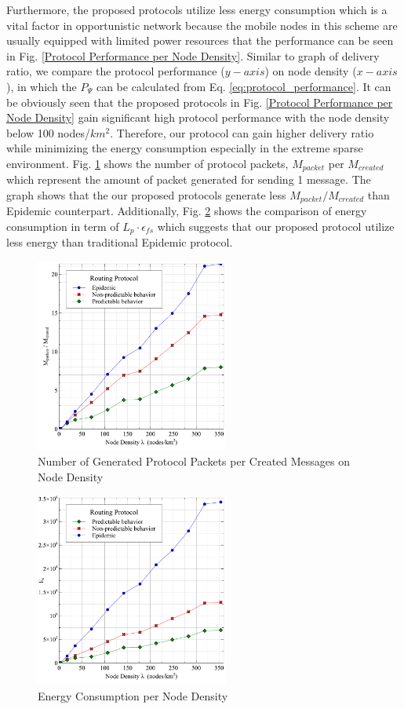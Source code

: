 \documentclass[conference]{IEEEtran}
\begin{document}
Furthermore, the proposed protocols utilize less energy consumption which is a vital factor in opportunistic network because the mobile nodes in this scheme are usually equipped with limited power resources that the performance can be seen in Fig. \ref{Protocol Performance per Node Density}.
Similar to graph of delivery ratio, we compare the protocol performance ($y-axis$) on node density ($x-axis$), in which the $P_{\Psi}$ can be calculated from Eq. \ref{eq:protocol_performance}.
It can be obviously seen that the proposed protocols in Fig. \ref{Protocol Performance per Node Density} gain significant high protocol performance with the node density below 100 nodes/$km^2$.
Therefore, our protocol can gain higher delivery ratio while minimizing the energy consumption especially in the extreme sparse environment.
Fig. \ref{Number of Generated Protocol Packets} shows the number of protocol packets, $M_{packet}$ per $M_{created}$ which represent the amount of packet generated for sending 1 message.
%
The graph shows that the our proposed protocols generate less  $M_{packet}/M_{created}$ than Epidemic counterpart.
Additionally, Fig. \ref{Energy Consumption per Node Density} shows the comparison of energy consumption in term of $ L_p \cdot  { \epsilon  }_{ fs }$ which suggests that our proposed protocol utilize less energy than traditional Epidemic protocol.


\begin{figure}[!t]
	\centering
	\includegraphics[width=2.5in]{Graphs/messages.pdf}
	\caption{Number of Generated Protocol Packets per Created Messages on Node Density}
	\label{Number of Generated Protocol Packets}
\end{figure}

\begin{figure}[!t]
	\centering
	\includegraphics[width=2.5in]{Graphs/EnergyConsumption.pdf}
	\caption{Energy Consumption per Node Density}
	\label{Energy Consumption per Node Density}
\end{figure}
\end{document}

